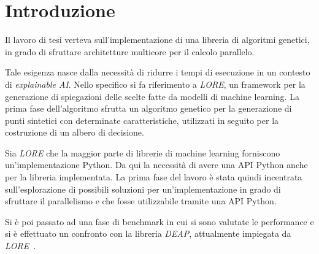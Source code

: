 \chapter*{Introduzione}

Il lavoro di tesi verteva sull'implementazione di una libreria di algoritmi
genetici, in grado di sfruttare architetture multicore per il calcolo parallelo.

Tale esigenza nasce dalla necessità di ridurre i tempi di esecuzione in un
contesto di \textit{explainable AI}. Nello specifico si fa riferimento a
\textit{LORE}, un framework per la generazione di spiegazioni delle scelte
fatte da modelli di machine learning. La prima fase dell'algoritmo sfrutta un
algoritmo genetico per la generazione di punti sintetici con determinate
caratteristiche, utilizzati in seguito per la costruzione di un albero di
decisione.

Sia \textit{LORE} che la maggior parte di librerie di machine learning
forniscono un'implementazione Python. Da qui la necessità di avere una API
Python anche per la libreria implementata. La prima fase del lavoro è stata
quindi incentrata sull'esplorazione di possibili soluzioni per
un'implementazione in grado di sfruttare il parallelismo e che fosse
utilizzabile tramite una API Python.

Si è poi passato ad una fase di benchmark in cui si sono valutate le
performance e si è effettuato un confronto con la libreria \textit{DEAP},
attualmente impiegata da \textit{LORE}~\cite{guidotti2018survey}.